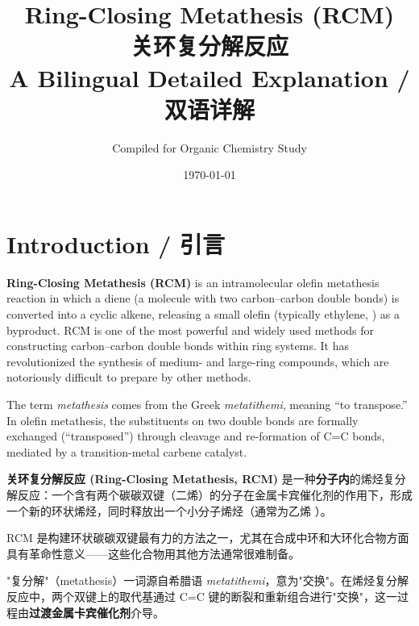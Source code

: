 \documentclass[11pt, a4paper]{article}
\title{%
  \textcolor{accentblue}{\Huge Ring-Closing Metathesis (RCM)}\\[6pt]
  \textcolor{accentred}{\LARGE 关环复分解反应}\\[12pt]
  \large A Bilingual Detailed Explanation / 双语详解
}
\author{Compiled for Organic Chemistry Study}
\date{\today}
\begin{document}
\maketitle
\thispagestyle{fancy}
\tableofcontents
\newpage

\section{Introduction / 引言}

\begin{enbox}[English]
\textbf{Ring-Closing Metathesis (RCM)} is an intramolecular olefin metathesis reaction in which a diene (a molecule with two carbon--carbon double bonds) is converted into a cyclic alkene, releasing a small olefin (typically ethylene, ) as a byproduct.  RCM is one of the most powerful and widely used methods for constructing carbon--carbon double bonds within ring systems.  It has revolutionized the synthesis of medium- and large-ring compounds, which are notoriously difficult to prepare by other methods.

The term \textit{metathesis} comes from the Greek \textit{metatithemi}, meaning ``to transpose.''  In olefin metathesis, the substituents on two double bonds are formally exchanged (``transposed'') through cleavage and re-formation of C=C bonds, mediated by a transition-metal carbene catalyst.
\end{enbox}

\begin{cnbox}[中文]
\textbf{关环复分解反应 (Ring-Closing Metathesis, RCM)} 是一种\textbf{分子内}的烯烃复分解反应：一个含有两个碳碳双键（二烯）的分子在金属卡宾催化剂的作用下，形成一个新的环状烯烃，同时释放出一个小分子烯烃（通常为乙烯 ）。

RCM 是构建环状碳碳双键最有力的方法之一，尤其在合成中环和大环化合物方面具有革命性意义——这些化合物用其他方法通常很难制备。

"复分解"（metathesis）一词源自希腊语 \textit{metatithemi}，意为"交换"。在烯烃复分解反应中，两个双键上的取代基通过 C=C 键的断裂和重新组合进行"交换"，这一过程由\textbf{过渡金属卡宾催化剂}介导。
\end{cnbox}


\end{document}

